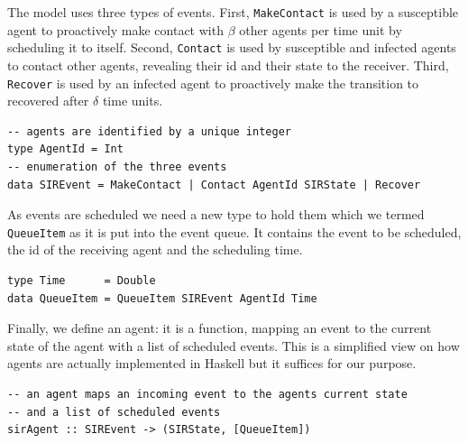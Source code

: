 The model uses three types of events. First, \texttt{MakeContact} is used by a susceptible agent to proactively make contact with $\beta$ other agents per time unit by scheduling it to itself. Second, \texttt{Contact} is used by susceptible and infected agents to contact other agents, revealing their id and their state to the receiver. Third, \texttt{Recover} is used by an infected agent to proactively make the transition to recovered after $\delta$ time units.

\begin{footnotesize}
\begin{verbatim}
-- agents are identified by a unique integer
type AgentId = Int
-- enumeration of the three events
data SIREvent = MakeContact | Contact AgentId SIRState | Recover 
\end{verbatim}
\end{footnotesize}

As events are scheduled we need a new type to hold them which we termed \texttt{QueueItem} as it is put into the event queue. It contains the event to be scheduled, the id of the receiving agent and the scheduling time.

\begin{footnotesize}
\begin{verbatim}
type Time      = Double
data QueueItem = QueueItem SIREvent AgentId Time
\end{verbatim}
\end{footnotesize}

Finally, we define an agent: it is a function, mapping an event to the current state of the agent with a list of scheduled events. This is a simplified view on how agents are actually implemented in Haskell but it suffices for our purpose.

\begin{footnotesize}
\begin{verbatim}
-- an agent maps an incoming event to the agents current state 
-- and a list of scheduled events
sirAgent :: SIREvent -> (SIRState, [QueueItem])
\end{verbatim}
\end{footnotesize}

